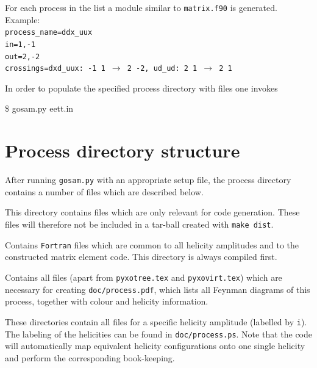 \documentclass[11pt,a4paper]{refrep}
\begin{document}
\begin{enumerate}
    For each process in the list a module similar to {\tt matrix.f90} is  generated.  
    Example: \\                                                 
    {\tt process\_name=ddx\_uux }\\                                           
    {\tt in=1,-1 }\\                                                          
    {\tt out=2,-2  }\\                                                       
    {\tt crossings=dxd\_uux: -1 1 $\to$ 2 -2, ud\_ud: 2 1 $\to$ 2 1  }    
\end{enumerate}



In order to populate the specified process directory with files
one invokes
\begin{example}
\$ gosam.py eett.in
\end{example}

\section{Process directory structure}



After running \texttt{gosam.py} with an appropriate setup file, the
process directory contains a number of files which are described below.

 This directory contains files which are only
relevant for code ge\-ne\-ration. These files will therefore not be included
in a tar-ball created with \texttt{make dist}.

 Contains {\tt Fortran} files which are common to all helicity
amplitudes and to the constructed matrix element code. This directory
is always compiled first.

 Contains all files (apart from
\texttt{pyxotree.tex} and \texttt{pyxovirt.tex}) which are
necessary for creating
\texttt{doc/process.pdf}, which lists all Feynman diagrams of this process, 
together with colour and helicity information.

 These directories contain all files for a specific
helicity amplitude (labelled by {\tt i}). The labeling of the helicities can be found in
\texttt{doc/process.ps}. 
Note that the code will automatically map equivalent helicity 
configurations onto one single helicity and perform the corresponding book-keeping.
\end{document}
